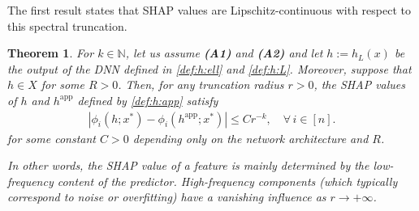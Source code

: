 \documentclass[letterpaper,11pt]{article}
\numberwithin{equation}{section}
\newtheorem{theorem}{Theorem}[section]
\renewcommand{\leq}{\leqslant}
\numberwithin{equation}{section}
\begin{document}
The first result states that SHAP values are Lipschitz-continuous with respect to this spectral truncation.

\begin{theorem}
    \label{main:thm}
    For $k\in \mathbb{N}$, let us assume {\bf (A1)} and {\bf (A2)} and let $h:=h_L(x)$ be the output of the DNN defined in \eqref{def:h:ell} and \eqref{def:h:L}. Moreover, suppose that $h\in X$ for some $R>0$. Then, for any truncation radius $r>0$, the SHAP values of $h$ and $h^{\text{app}}$ defined by \eqref{def:h:app} satisfy
    \begin{align*}
        |\phi_i(h;x^*) - \phi_i(h^{\text{app}};x^*)| \leq C r^{-k},\quad \forall\, i\in [n].
    \end{align*}
    for some constant $C>0$ depending only on the network architecture and $R$.

    In other words, the SHAP value of a feature is mainly determined by the low-frequency content of the predictor. High-frequency components (which typically correspond to noise or overfitting) have a vanishing influence as $r\to +\infty$.
\end{theorem}
\end{document}
